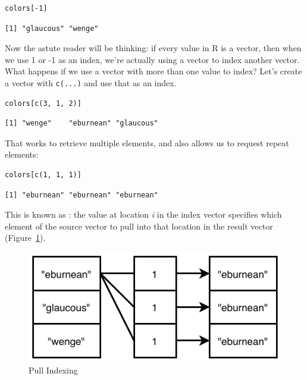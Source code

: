 \begin{lstlisting}
colors[-1]
\end{lstlisting}

\begin{lstlisting}
[1] "glaucous" "wenge"   
\end{lstlisting}

Now the astute reader will be thinking: if every value in R is a vector,
then when we use 1 or -1 as an index,
we're actually using a vector to index another vector.
What happens if we use a vector with more than one value to index?
Let's create a vector with \texttt{c(...)} and use that as an index.

\begin{lstlisting}
colors[c(3, 1, 2)]
\end{lstlisting}

\begin{lstlisting}
[1] "wenge"    "eburnean" "glaucous"
\end{lstlisting}

That works to retrieve multiple elements, and also allows us to request repeat elements:

\begin{lstlisting}
colors[c(1, 1, 1)]
\end{lstlisting}

\begin{lstlisting}
[1] "eburnean" "eburnean" "eburnean"
\end{lstlisting}

This is known as :
the value at location \emph{i} in the index vector specifies which element of the source vector
to pull into that location in the result vector (Figure~\ref{fig:pull-indexing}).

\begin{figure}[h]
  \includegraphics{figures/basics/pull-indexing.pdf}
  \caption{Pull Indexing}
  \label{fig:pull-indexing}
\end{figure}

